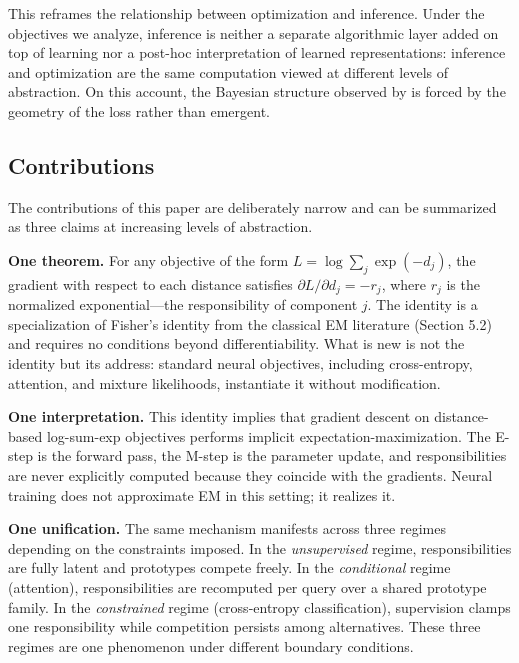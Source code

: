 This reframes the relationship between optimization and inference. Under the objectives we analyze, inference is neither a separate algorithmic layer added on top of learning nor a post-hoc interpretation of learned representations: inference and optimization are the same computation viewed at different levels of abstraction. On this account, the Bayesian structure observed by \citet{agarwal2025gradient} is forced by the geometry of the loss rather than emergent.

\subsection{Contributions}

The contributions of this paper are deliberately narrow and can be summarized as three claims at increasing levels of abstraction.

\textbf{One theorem.} For any objective of the form $L = \log \sum_j \exp(-d_j)$, the gradient with respect to each distance satisfies $\partial L / \partial d_j = -r_j$, where $r_j$ is the normalized exponential---the responsibility of component $j$. The identity is a specialization of Fisher's identity from the classical EM literature (Section 5.2) and requires no conditions beyond differentiability. What is new is not the identity but its address: standard neural objectives, including cross-entropy, attention, and mixture likelihoods, instantiate it without modification.

\textbf{One interpretation.} This identity implies that gradient descent on distance-based log-sum-exp objectives performs implicit expectation-maximization. The E-step is the forward pass, the M-step is the parameter update, and responsibilities are never explicitly computed because they coincide with the gradients. Neural training does not approximate EM in this setting; it realizes it.

\textbf{One unification.} The same mechanism manifests across three regimes depending on the constraints imposed. In the \emph{unsupervised} regime, responsibilities are fully latent and prototypes compete freely. In the \emph{conditional} regime (attention), responsibilities are recomputed per query over a shared prototype family. In the \emph{constrained} regime (cross-entropy classification), supervision clamps one responsibility while competition persists among alternatives. These three regimes are one phenomenon under different boundary conditions.
